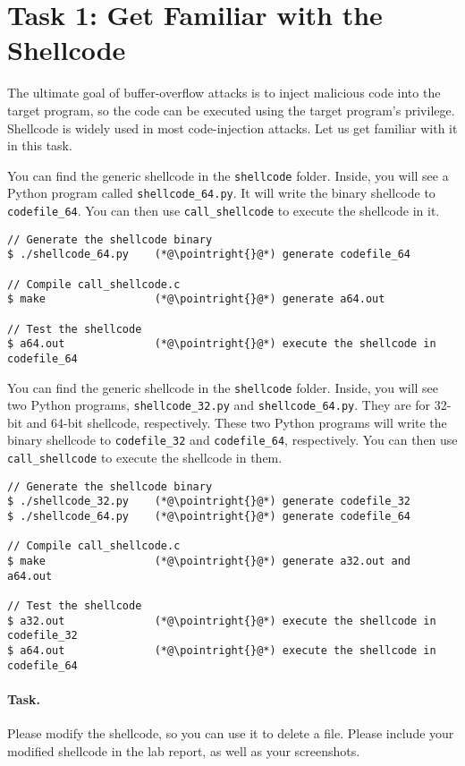 
\section{Task 1: Get Familiar with the Shellcode}

The ultimate goal of buffer-overflow attacks is to inject
malicious code into the target program, so the code can be
executed using the target program's privilege.
Shellcode is widely used in most code-injection attacks.
Let us get familiar with it in this task.




\ifdefined\arm
You can find the generic shellcode in the \texttt{shellcode} folder.
Inside, you will see a Python program called \texttt{shellcode\_64.py}. 
It will write the binary shellcode to \texttt{codefile\_64}.
You can then use 
\texttt{call\_shellcode} to execute the shellcode in it. 

\begin{lstlisting}
// Generate the shellcode binary 
$ ./shellcode_64.py    (*@\pointright{}@*) generate codefile_64

// Compile call_shellcode.c
$ make                 (*@\pointright{}@*) generate a64.out 

// Test the shellcode 
$ a64.out              (*@\pointright{}@*) execute the shellcode in codefile_64
\end{lstlisting}

\else 
You can find the generic shellcode in the \texttt{shellcode} folder.
Inside, you will see two Python programs, 
\texttt{shellcode\_32.py} and \texttt{shellcode\_64.py}. 
They are for 32-bit and 64-bit shellcode, respectively. 
These two Python programs will
write the binary shellcode to \texttt{codefile\_32}
and \texttt{codefile\_64}, respectively. You can then use 
\texttt{call\_shellcode} to execute the shellcode in them. 

\begin{lstlisting}
// Generate the shellcode binary 
$ ./shellcode_32.py    (*@\pointright{}@*) generate codefile_32
$ ./shellcode_64.py    (*@\pointright{}@*) generate codefile_64

// Compile call_shellcode.c
$ make                 (*@\pointright{}@*) generate a32.out and a64.out 

// Test the shellcode 
$ a32.out              (*@\pointright{}@*) execute the shellcode in codefile_32
$ a64.out              (*@\pointright{}@*) execute the shellcode in codefile_64
\end{lstlisting}
\fi 
 

\paragraph{Task.} Please modify the shellcode, so you can
use it to delete a file.  Please include your modified shellcode
in the lab report, as well as your screenshots.

